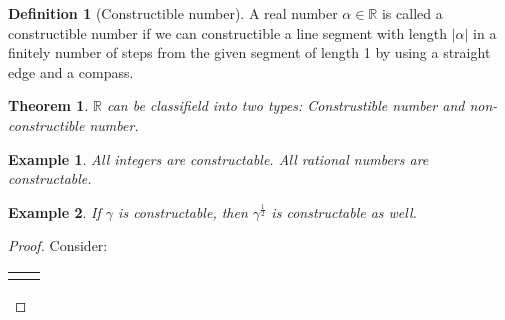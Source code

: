 \documentclass{article}
\theoremstyle{MyNonumberplain}
\theoremstyle{break}
\newtheorem*{proof}{Proof. }
\newcommand{\R}{\mathbb{R}}
\newcommand{\nline}{\begin{tabular}{ll}&\\\end{tabular}}
\theoremstyle{break}
\newtheorem{theorem}{Theorem}[section]
\newtheorem{example}{Example}[section]
\theoremstyle{break}
\theoremstyle{definition}
\theoremstyle{break}
\newtheorem{definition}{Definition}[section]
\begin{document}
\begin{defbox}
    \begin{definition}[Constructible number]
        A real number $\alpha \in \mathbb{R}$ is called a constructible number if we
        can constructible a line segment with length $| \alpha |$ in a finitely number
        of steps from the given segment of length 1 by using a straight edge and a
        compass.
    \end{definition}
\end{defbox}

\begin{thmbox}
    \begin{theorem}
        $\R$ can be classifield into two types: Construstible number and non-constructible number.
    \end{theorem}
\end{thmbox}

\begin{expbox}
    \begin{example}
        All integers are constructable. All rational numbers are constructable.
    \end{example}
\end{expbox}

\begin{expbox}
    \begin{example}
        If $\gamma$ is constructable, then $\gamma^{\frac{1}{2}}$ is constructable as
        well.
    \end{example}
    \begin{prfbox}
        \begin{proof}

            Consider:

            \nline

            \begin{center}
            \end{center}



        \end{proof}
    \end{prfbox}
\end{expbox}
\end{document}
